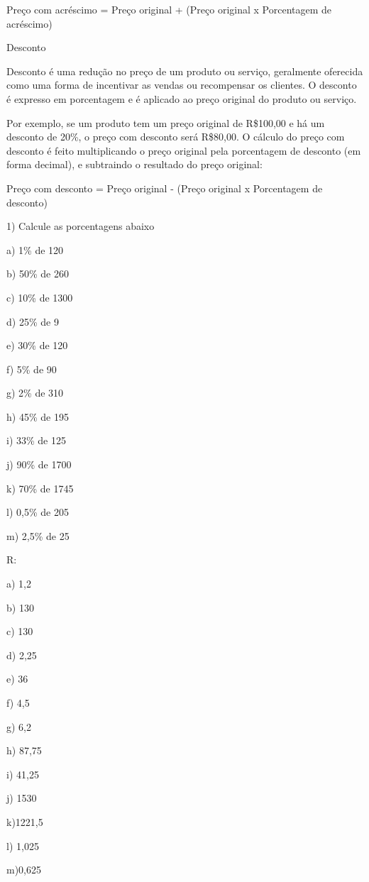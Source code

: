 Preço com acréscimo = Preço original + (Preço original x Porcentagem de
acréscimo)

Desconto

Desconto é uma redução no preço de um produto ou serviço, geralmente
oferecida como uma forma de incentivar as vendas ou recompensar os
clientes. O desconto é expresso em porcentagem e é aplicado ao preço
original do produto ou serviço.

Por exemplo, se um produto tem um preço original de R\$100,00 e há um
desconto de 20\%, o preço com desconto será R\$80,00. O cálculo do preço
com desconto é feito multiplicando o preço original pela porcentagem de
desconto (em forma decimal), e subtraindo o resultado do preço original:

Preço com desconto = Preço original - (Preço original x Porcentagem de
desconto)


1) Calcule as porcentagens abaixo

a) 1\% de 120

b) 50\% de 260

c) 10\% de 1300

d) 25\% de 9

e) 30\% de 120

f) 5\% de 90

g) 2\% de 310

h) 45\% de 195

i) 33\% de 125

j) 90\% de 1700

k) 70\% de 1745

l) 0,5\% de 205

m) 2,5\% de 25

R:

a) 1,2

b) 130

c) 130

d) 2,25

e) 36

f) 4,5

g) 6,2

h) 87,75

i) 41,25

j) 1530

k)1221,5

l) 1,025

m)0,625

